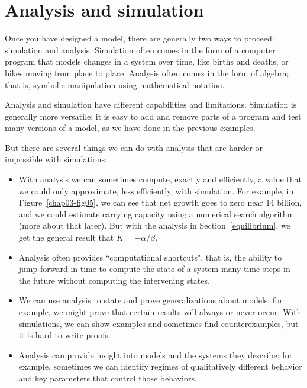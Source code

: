 \documentclass[12pt]{book}
\theoremstyle{exercise}
\begin{document}
\section{Analysis and simulation}

Once you have designed a model, there are generally two ways to proceed: simulation and analysis.  Simulation often comes in the form of a computer program that models changes in a system over time, like births and deaths, or bikes moving from place to place.  Analysis often comes in the form of algebra; that is, symbolic manipulation using mathematical notation.


Analysis and simulation have different capabilities and limitations.  Simulation is generally more versatile; it is easy to add and remove parts of a program and test many versions of a model, as we have done in the previous examples.

But there are several things we can do with analysis that are harder or impossible with simulations:

\begin{itemize}

\item With analysis we can sometimes compute, exactly and efficiently, a value that we could only approximate, less efficiently, with simulation.  For example, in Figure~\ref{chap03-fig05}, we can see that net growth goes to zero near 14 billion, and we could estimate carrying capacity using a numerical search algorithm (more about that later).  But with the analysis in Section~\ref{equilibrium}, we get the general result that $K=-\alpha/\beta$.

\item Analysis often provides ``computational shortcuts", that is, the ability to jump forward in time to compute the state of a system many time steps in the future without computing the intervening states.


\item We can use analysis to state and prove generalizations about models; for example, we might prove that certain results will always or never occur.  With simulations, we can show examples and sometimes find counterexamples, but it is hard to write proofs.


\item Analysis can provide insight into models and the systems they describe; for example, sometimes we can identify regimes of qualitatively different behavior and key parameters that control those behaviors.


\end{itemize}
\end{document}
